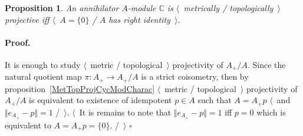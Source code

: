 \documentclass[12pt]{article}
\newtheorem{proposition}[theorem]{Proposition}
\renewenvironment{proof}{\paragraph{Proof.}}{\hfill$\square$\medskip}
\begin{document}
\begin{proposition}\label{MetTopProjModCCharac} An annihilator $A$-module
    $\mathbb{C}$ is $\langle$~metrically / topologically~$\rangle$ projective
    iff $\langle$~$A=\{0\}$ / $A$ has right identity~$\rangle$.
\end{proposition}
\begin{proof}
    It is enough to study $\langle$~metric / topological~$\rangle$ projectivity
    of $A_+/A$. Since the natural quotient map $\pi:A_+\to A_+/A$ is a strict
    coisometry, then by proposition~\ref{MetTopProjCycModCharac}
    $\langle$~metric / topological~$\rangle$ projectivity of $A_+/A$ is
    equivalent to existence of idempotent $p\in A$ such that $A=A_+p$
    $\langle$~and  $\Vert e_{A_+}-p\Vert=1$ /~$\rangle$. $\langle$~It is remains
    to note that $\Vert e_{A_+}-p\Vert=1$ iff $p=0$ which is equivalent to
    $A=A_+p=\{0\}$. /~$\rangle$
\end{proof}
\end{document}
